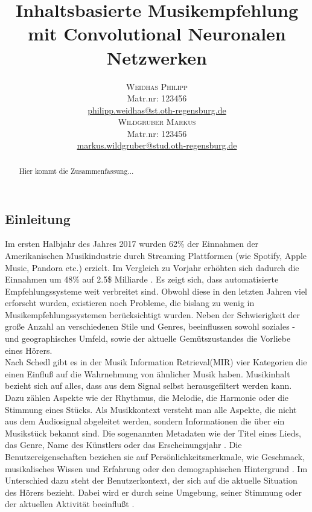 \documentclass[twosided,a4,10pt]{article}
\title{\vspace{-5mm}%
	\fontsize{20pt}{10pt}\selectfont
	\textbf{Inhaltsbasierte Musikempfehlung mit Convolutional Neuronalen Netzwerken}
	}
\author{
	\large\begin{minipage}[t]{0.5\linewidth}
		\begin{center}
			\textsc{Weidhas Philipp}\\[2mm]
			\normalsize	Matr.nr: 123456\\
			\normalsize
			\href{mailto:philipp.weidhas@st.oth-regensburg.de}
			{philipp.weidhas@st.oth-regensburg.de}      
		\end{center}
	\end{minipage}        
	\begin{minipage}[t]{0.5\linewidth}
         \begin{center}
           	\textsc{Wildgruber Markus}\\[2mm]
                 \normalsize	Matr.nr: 123456\\
                 \normalsize
                 \href{mailto:markus.wildgruber@stud.oth-regensburg.de}
                 {markus.wildgruber@stud.oth-regensburg.de}      
         \end{center}
       \end{minipage}
     }
\begin{document}
\maketitle
\thispagestyle{fancy}

	

\begin{multicols}{2}

\begin{abstract}
\noindent Hier kommt die Zusammenfassung...
\end{abstract}


\section{Einleitung}
Im ersten Halbjahr des Jahres 2017 wurden 62\% der Einnahmen der Amerikanischen Musikindustrie durch Streaming Plattformen (wie Spotify, Apple Music, Pandora etc.) erzielt. Im Vergleich zu Vorjahr erhöhten sich dadurch die Einnahmen um 48\% auf 2.5\$ Milliarde \cite{friedlander}\cite{rys}. Es zeigt sich, dass automatisierte Empfehlungssysteme weit verbreitet sind.\newline
Obwohl diese in den letzten Jahren viel erforscht wurden, existieren noch Probleme, die bislang zu wenig in Musikempfehlungssystemen berücksichtigt wurden. Neben der Schwierigkeit der große Anzahl an verschiedenen Stile und Genres, beeinflussen sowohl soziales - und geographisches Umfeld, sowie der aktuelle Gemütszustandes die Vorliebe eines Hörers. \cite{oord}\newline\\
Nach Schedl \cite{schedl} gibt es in der Musik Information Retrieval(MIR) vier Kategorien die einen Einfluß auf die Wahrnehmung von ähnlicher Musik haben. Musikinhalt bezieht sich auf alles, dass aus dem Signal selbst herausgefiltert werden kann. Dazu zählen Aspekte wie der Rhythmus, die Melodie, die Harmonie oder die Stimmung eines Stücks.\cite{knees}\newline
Als Musikkontext versteht man alle Aspekte, die nicht aus dem Audiosignal abgeleitet werden, sondern Informationen die über ein Musikstück bekannt sind. Die sogenannten Metadaten wie der Titel eines Lieds, das Genre, Name des Künstlers oder das Erscheinungsjahr \cite{knees}.\newline
Die Benutzereigenschaften beziehen sie auf Persönlichkeitsmerkmale, wie Geschmack, musikalisches Wissen und Erfahrung oder den demographischen Hintergrund \cite{knees}.\newline
Im Unterschied dazu steht der Benutzerkontext, der sich auf die aktuelle Situation des Hörers bezieht. Dabei wird er durch seine Umgebung, seiner Stimmung oder der aktuellen Aktivität beeinflußt \cite{knees}.\newline

\end{multicols}
\end{document}
